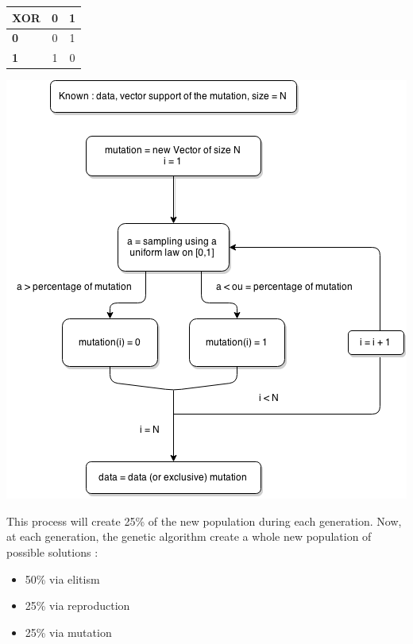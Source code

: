 \documentclass{report}
\begin{document}
	\vspace{0.5cm}
	\begin{center}
		\begin{tabular}{|l|c|c|}
			\hline \textbf{XOR} & \textbf{0} & \textbf{1}\\
			\hline \textbf{0} & 0 & 1\\
			\hline \textbf{1} & 1 & 0\\
			\hline
		\end{tabular}
	\end{center}
	
	\vspace{1cm}
	\begin{center}
		\includegraphics[scale=0.65]{ressources/ag2}
	\end{center}
	
	\vspace{1cm}
	
	This process will create 25\% of the new population during each generation. Now, at each generation, the genetic algorithm create a whole new population of possible solutions :
	
	\begin{itemize}
		\item 50\% via elitism
		\item 25\% via reproduction
		\item 25\% via mutation		
	\end{itemize}	
	\vspace{0.5cm}
	
\end{document}
